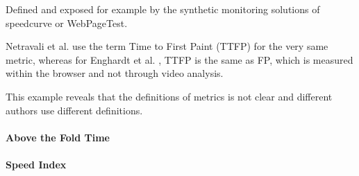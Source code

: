 Defined and exposed for example by the synthetic monitoring solutions of speedcurve or WebPageTest.

Netravali et al. use the term Time to First Paint (TTFP) for the very same metric, %
whereas for Enghardt et al. , TTFP is the same as FP, which is measured within the browser and not through video analysis. %

This example reveals that the definitions of metrics is not clear and different authors use different definitions.







\paragraph{Above the Fold Time}













\paragraph{Speed Index}
















